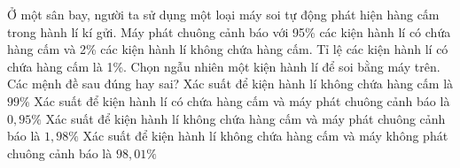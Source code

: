 \begin{ex}%
    Ở một sân bay, người ta sử dụng một loại máy soi tự động phát hiện hàng cấm trong hành lí kí gửi. Máy phát chuông cảnh báo với 95\% các kiện hành lí có chứa hàng cấm và 2\% các kiện hành lí không chứa hàng cấm. Tỉ lệ các kiện hành lí có chứa hàng cấm là 1\%. Chọn ngẫu nhiên một kiện hành lí để soi bằng máy trên. Các mệnh đề sau đúng hay sai?
    \choiceTF
    {\True Xác suất để kiện hành lí không chứa hàng cấm là $99\%$}
    {\True Xác suất để kiện hành lí có chứa hàng cấm và máy phát chuông cảnh báo là $0,95\%$}
    {\True Xác suất để kiện hành lí không chứa hàng cấm và máy phát chuông cảnh báo là $1,98\%$}
    { Xác suất để kiện hành lí không chứa hàng cấm và máy không phát chuông cảnh báo là $98,01\%$}
\end{ex}
